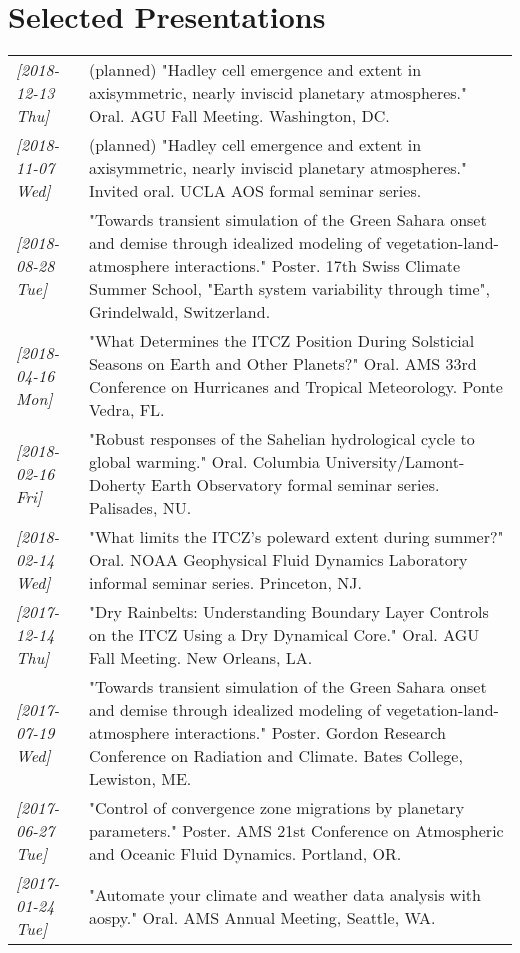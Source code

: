 \documentclass[12pt,letterpaper]{shillcv}
\begin{document}
\section*{Selected Presentations}
\label{sec:org2eec104}
\begin{center}
\begin{tabularx}{\textwidth}{lX}
\textit{[2018-12-13 Thu]} & (planned) "Hadley cell emergence and extent in axisymmetric, nearly inviscid planetary atmospheres."  Oral.  AGU Fall Meeting.  Washington, DC.\\
\textit{[2018-11-07 Wed]} & (planned) "Hadley cell emergence and extent in axisymmetric, nearly inviscid planetary atmospheres."  Invited oral.  UCLA AOS formal seminar series.\\
\textit{[2018-08-28 Tue]} & "Towards transient simulation of the Green Sahara onset and demise through idealized modeling of vegetation-land-atmosphere interactions."  Poster.  17th Swiss Climate Summer School, "Earth system variability through time", Grindelwald, Switzerland.\\
\textit{[2018-04-16 Mon]} & "What Determines the ITCZ Position During Solsticial Seasons on Earth and Other Planets?"  Oral.  AMS 33rd Conference on Hurricanes and Tropical Meteorology.  Ponte Vedra, FL.\\
\textit{[2018-02-16 Fri]} & "Robust responses of the Sahelian hydrological cycle to global warming."  Oral.  Columbia University/Lamont-Doherty Earth Observatory formal seminar series.  Palisades, NU.\\
\textit{[2018-02-14 Wed]} & "What limits the ITCZ's poleward extent during summer?"  Oral.  NOAA Geophysical Fluid Dynamics Laboratory informal seminar series.  Princeton, NJ.\\
\textit{[2017-12-14 Thu]} & "Dry Rainbelts: Understanding Boundary Layer Controls on the ITCZ Using a Dry Dynamical Core."  Oral.  AGU Fall Meeting.  New Orleans, LA.\\
\textit{[2017-07-19 Wed]} & "Towards transient simulation of the Green Sahara onset and demise through idealized modeling of vegetation-land-atmosphere interactions."  Poster.  Gordon Research Conference on Radiation and Climate.  Bates College, Lewiston, ME.\\
\textit{[2017-06-27 Tue]} & "Control of convergence zone migrations by planetary parameters."  Poster.  AMS 21st Conference on Atmospheric and Oceanic Fluid Dynamics.  Portland, OR.\\
\textit{[2017-01-24 Tue]} & "Automate your climate and weather data analysis with aospy."  Oral.  AMS Annual Meeting, Seattle, WA.\\

\end{tabularx}
\end{center}
\end{document}

